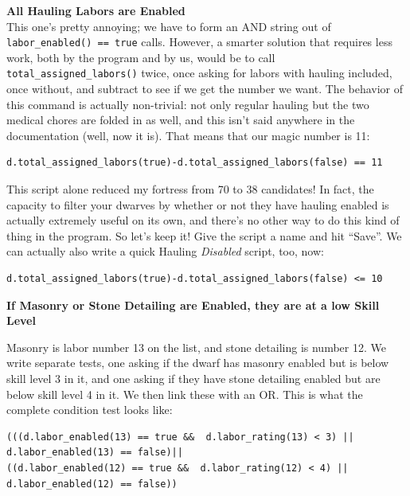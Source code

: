 \documentclass[]{article}
\begin{document}
\textbf{All Hauling Labors are Enabled}\\
This one's pretty annoying; we have to form an AND string out of \texttt{labor\_enabled() == true}
calls. However, a smarter solution that requires less work, both by the program and by us, would be to
call\\\texttt{total\_assigned\_labors()} twice, once asking for labors with hauling included, once
without, and subtract to see if we get the number we want. The behavior of this command is actually
non-trivial: not only regular hauling but the two medical chores are folded in as well, and this isn't
said anywhere in the documentation (well, now it is). That means that our magic number is 11:

\begin{verbatim}
d.total_assigned_labors(true)-d.total_assigned_labors(false) == 11
\end{verbatim}

%

This script alone reduced my fortress from 70 to 38 candidates! In fact, the capacity to filter your
dwarves by whether or not they have hauling enabled is actually extremely useful on its own, and there's
no other way to do this kind of thing in the program. So let's keep it! Give the script a name and hit
``Save''. We can actually also write a quick Hauling \emph{Disabled} script, too, now:
\begin{verbatim}
d.total_assigned_labors(true)-d.total_assigned_labors(false) <= 10
\end{verbatim}

\textbf{If Masonry or Stone Detailing are Enabled, they are at a low Skill Level}

Masonry is labor number 13 on the list, and stone detailing is number 12. We write separate tests, one
asking if the dwarf has masonry enabled but is below skill level 3 in it, and one asking if they have
stone detailing enabled but are below skill level 4 in it. We then link these with an OR. This is what
the complete condition test looks like:
\begin{verbatim}
(((d.labor_enabled(13) == true &&  d.labor_rating(13) < 3) ||
d.labor_enabled(13) == false)|| 
((d.labor_enabled(12) == true &&  d.labor_rating(12) < 4) ||
d.labor_enabled(12) == false))
\end{verbatim}
\end{document}
